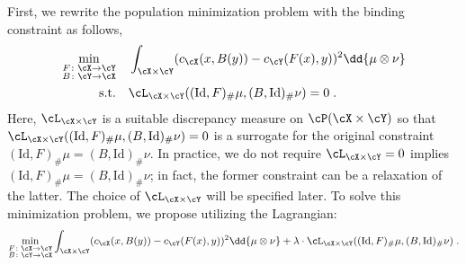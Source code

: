 \documentclass[11pt]{article}
\begin{document}
First, we rewrite the population minimization problem with the binding constraint as follows,
\begin{align*}
	\min_{\substack{F \colon \cX \to \cY \\ B \colon \cY \to \cX}} \quad & \int_{\cX \times \cY} (c_{\cX}(x, B(y)) - c_{\cY}(F(x), y))^2 \dd{\mu \otimes \nu} \\
	\mathrm{s.t.} \quad & \cL_{\cX \times \cY}((\mathrm{Id}, F)_{\#} \mu, (B, \mathrm{Id})_{\#} \nu) = 0\;.
\end{align*}
Here, $\cL_{\cX \times \cY}$ is a suitable discrepancy measure on $\cP(\cX \times \cY)$ so that $\cL_{\cX \times \cY}((\mathrm{Id}, F)_{\#} \mu, (B, \mathrm{Id})_{\#} \nu) = 0$ is a surrogate for the original constraint $(\mathrm{Id}, F)_{\#}\mu = (B, \mathrm{Id})_{\#} \nu$. In practice, we do not require $\cL_{\cX \times \cY} = 0$ implies $(\mathrm{Id}, F)_{\#}\mu = (B, \mathrm{Id})_{\#} \nu$; in fact, the former constraint can be a relaxation of the latter. The choice of $\cL_{\cX \times \cY}$ will be specified later. To solve this minimization problem, we propose utilizing the Lagrangian:
\begin{equation*}
	\min_{\substack{F \colon \cX \to \cY \\ B \colon \cY \to \cX}} \int_{\cX \times \cY} (c_{\cX}(x, B(y)) - c_{\cY}(F(x), y))^2 \dd{\mu \otimes \nu} + \lambda \cdot \cL_{\cX \times \cY}((\mathrm{Id}, F)_{\#} \mu, (B, \mathrm{Id})_{\#} \nu)\;.
\end{equation*}
\end{document}
